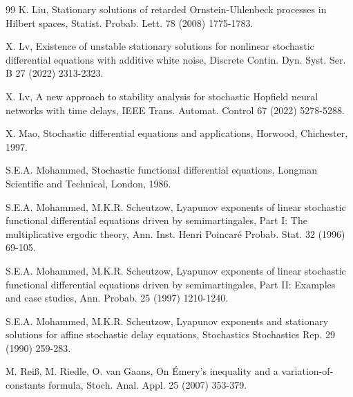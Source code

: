 \documentclass[preprint,12pt]{elsarticle}
\begin{document}
\begin{thebibliography}{99}
K. Liu, Stationary solutions of retarded Ornstein-Uhlenbeck processes in Hilbert spaces, Statist. Probab. Lett. 78 (2008) 1775-1783.

 X. Lv, Existence of unstable stationary solutions for nonlinear stochastic differential equations with additive white noise, Discrete Contin. Dyn. Syst. Ser. B 27 (2022) 2313-2323.

 X. Lv, A new approach to stability analysis for stochastic Hopfield neural networks with time delays, IEEE Trans. Automat. Control 67 (2022) 5278-5288.

 X. Mao,
Stochastic differential equations and applications, Horwood, Chichester, 1997.

 S.E.A. Mohammed, Stochastic functional differential equations, Longman
Scientific and Technical, London, 1986.

 S.E.A. Mohammed, M.K.R. Scheutzow, Lyapunov exponents of linear stochastic functional differential equations driven by semimartingales, Part I: The multiplicative ergodic theory, Ann. Inst. Henri Poincaré Probab. Stat. 32 (1996) 69-105.

 S.E.A. Mohammed, M.K.R. Scheutzow, Lyapunov exponents of linear stochastic functional differential equations driven by semimartingales, Part II: Examples and case studies, Ann. Probab. 25 (1997) 1210-1240.

 S.E.A. Mohammed, M.K.R. Scheutzow, Lyapunov exponents and stationary solutions for affine stochastic delay equations, Stochastics Stochastics Rep. 29 (1990) 259-283.

 M. Rei{\ss}, M. Riedle, O. van Gaans, On \'Emery's inequality and a variation-of-constants formula, Stoch. Anal. Appl. 25 (2007) 353-379.







\end{thebibliography}
\end{document}
